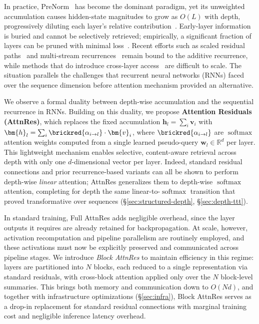 In practice, PreNorm~\cite{xiong2020layer} has become the dominant paradigm, yet its unweighted accumulation causes hidden-state magnitudes to grow as $O(L)$ with depth, progressively diluting each layer's relative contribution~\cite{li2026siamesenorm}. Early-layer information is buried and cannot be selectively retrieved; empirically, a significant fraction of layers can be pruned with minimal loss~\cite{gromov2025unreasonable}. Recent efforts such as scaled residual paths~\cite{wang2022deepnorm} and multi-stream recurrences~\cite{zhu2025hyperconnections} remain bound to the additive recurrence, while methods that do introduce cross-layer access~\cite{pagliardini2024denseformer,xiao2025muddformer} are difficult to scale. The situation parallels the challenges that recurrent neural networks (RNNs) faced over the sequence dimension before attention mechanism provided an alternative.

We observe a formal duality between depth-wise accumulation and the sequential recurrence in RNNs. Building on this duality, we propose \textbf{Attention Residuals (AttnRes)}, which replaces the fixed accumulation $\bm{h}_l = \sum_{i} \bm{v}_i$ with $\bm{h}_l = \sum_{i} \brickred{\alpha_{i \to l}} \cdot \bm{v}_i$, where $\brickred{\alpha_{i \to l}}$ are $\operatorname{softmax}$ attention weights computed from a single learned pseudo-query $\bm{w}_l \in \mathbb{R}^d$ per layer. This lightweight mechanism enables selective, content-aware retrieval across depth with only one $d$-dimensional vector per layer. Indeed, standard residual connections and prior recurrence-based variants can all be shown to perform depth-wise \emph{linear} attention; AttnRes generalizes them to depth-wise $\operatorname{softmax}$ attention, completing for depth the same linear-to-$\operatorname{softmax}$ transition that proved transformative over sequences (\S\ref{sec:structured-depth}, \S\ref{sec:depth-ttt}).

In standard training, Full AttnRes adds negligible overhead, since the layer outputs it requires are already retained for backpropagation. At scale, however, activation recomputation and pipeline parallelism are routinely employed, and these activations must now be explicitly preserved and communicated across pipeline stages. We introduce \textit{Block AttnRes} to maintain efficiency in this regime: layers are partitioned into $N$ blocks, each reduced to a single representation via standard residuals, with cross-block attention applied only over the $N$ block-level summaries. This brings both memory and communication down to $O(Nd)$, and together with infrastructure optimizations (\S\ref{sec:infra}), Block AttnRes serves as a drop-in replacement for standard residual connections with marginal training cost and negligible inference latency overhead.

